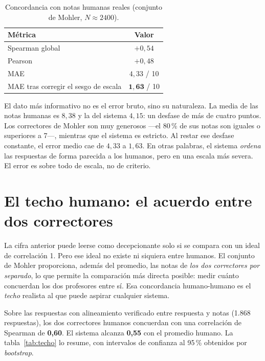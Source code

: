 \begin{table}[ht]
\centering
\caption{Concordancia con notas humanas reales (conjunto de Mohler, $N \approx 2400$).}
\label{tab:mohler}
\small
\begin{tabular}{lc}
\toprule
Métrica & Valor \\
\midrule
Spearman global & $+0{,}54$ \\
Pearson & $+0{,}48$ \\
MAE & $4{,}33$ / 10 \\
MAE tras corregir el sesgo de escala & $\mathbf{1{,}63}$ / 10 \\
\bottomrule
\end{tabular}
\end{table}

El dato más informativo no es el error bruto, sino su naturaleza. La media de las notas humanas es $8{,}38$ y la del sistema $4{,}15$: un desfase de más de cuatro puntos. Los correctores de Mohler son muy generosos —el 80\,\% de sus notas son iguales o superiores a 7—, mientras que el sistema es estricto. Al restar ese desfase constante, el error medio cae de $4{,}33$ a $1{,}63$. En otras palabras, el sistema \emph{ordena} las respuestas de forma parecida a los humanos, pero en una escala más severa. El error es sobre todo de escala, no de criterio.

\section{El techo humano: el acuerdo entre dos correctores}

La cifra anterior puede leerse como decepcionante solo si se compara con un ideal de correlación 1. Pero ese ideal no existe ni siquiera entre humanos. El conjunto de Mohler proporciona, además del promedio, las notas de \emph{los dos correctores por separado}, lo que permite la comparación más directa posible: medir cuánto concuerdan los dos profesores entre sí. Esa concordancia humano-humano es el \emph{techo} realista al que puede aspirar cualquier sistema.

Sobre las respuestas con alineamiento verificado entre respuesta y notas (1.868 respuestas), los dos correctores humanos concuerdan con una correlación de Spearman de \textbf{0,60}. El sistema alcanza \textbf{0,55} con el promedio humano. La tabla~\ref{tab:techo} lo resume, con intervalos de confianza al 95\,\% obtenidos por \emph{bootstrap}.

